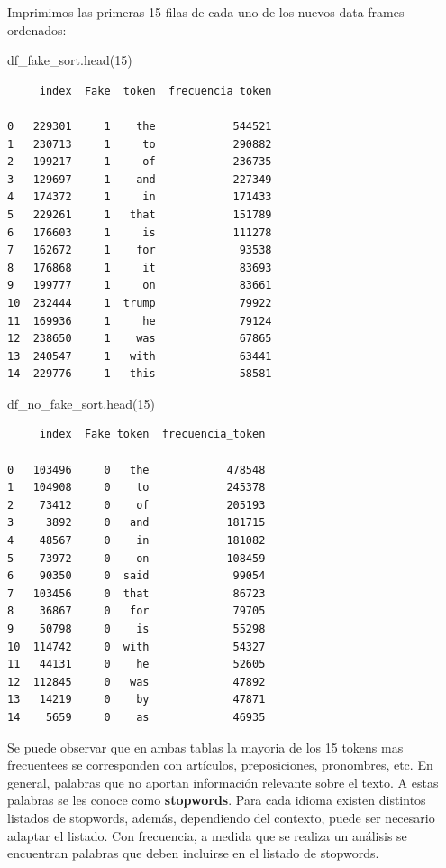 \documentclass[
  11pt,
  a4paper,
]{article}
\newenvironment{Shaded}{\begin{snugshade}}{\end{snugshade}}
\newcommand{\DecValTok}[1]{\textcolor[rgb]{0.00,0.00,0.81}{#1}}
\newcommand{\NormalTok}[1]{#1}
\begin{document}
Imprimimos las primeras 15 filas de cada uno de los nuevos data-frames
ordenados:

\begin{Shaded}
\begin{Highlighting}[]
\NormalTok{df\_fake\_sort.head(}\DecValTok{15}\NormalTok{)}
\end{Highlighting}
\end{Shaded}

\begin{verbatim}
     index  Fake  token  frecuencia_token
     
0   229301     1    the            544521
1   230713     1     to            290882
2   199217     1     of            236735
3   129697     1    and            227349
4   174372     1     in            171433
5   229261     1   that            151789
6   176603     1     is            111278
7   162672     1    for             93538
8   176868     1     it             83693
9   199777     1     on             83661
10  232444     1  trump             79922
11  169936     1     he             79124
12  238650     1    was             67865
13  240547     1   with             63441
14  229776     1   this             58581
\end{verbatim}

\begin{Shaded}
\begin{Highlighting}[]
\NormalTok{df\_no\_fake\_sort.head(}\DecValTok{15}\NormalTok{)}
\end{Highlighting}
\end{Shaded}

\begin{verbatim}
     index  Fake token  frecuencia_token
     
0   103496     0   the            478548
1   104908     0    to            245378
2    73412     0    of            205193
3     3892     0   and            181715
4    48567     0    in            181082
5    73972     0    on            108459
6    90350     0  said             99054
7   103456     0  that             86723
8    36867     0   for             79705
9    50798     0    is             55298
10  114742     0  with             54327
11   44131     0    he             52605
12  112845     0   was             47892
13   14219     0    by             47871
14    5659     0    as             46935
\end{verbatim}

Se puede observar que en ambas tablas la mayoria de los 15 tokens mas
frecuentees se corresponden con artículos, preposiciones, pronombres,
etc. En general, palabras que no aportan información relevante sobre el
texto. A estas palabras se les conoce como \textbf{stopwords}. Para cada
idioma existen distintos listados de stopwords, además, dependiendo del
contexto, puede ser necesario adaptar el listado. Con frecuencia, a
medida que se realiza un análisis se encuentran palabras que deben
incluirse en el listado de stopwords.
\end{document}
